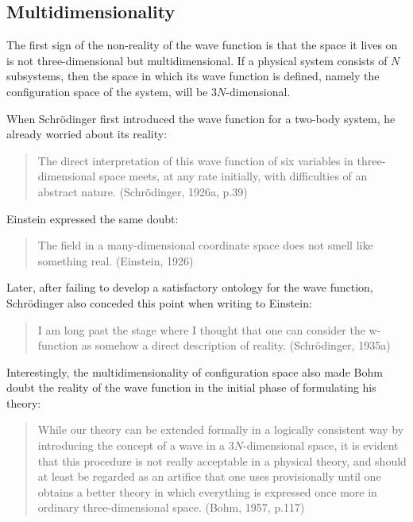 \subsection{Multidimensionality}

The first sign of the non-reality of the wave function is that the space it lives on is not three-dimensional but multidimensional. If a physical system consists of $N$ subsystems, then the space in which its wave function is defined, namely the configuration space of the system, will be $3N$-dimensional. 

When Schr\"{o}dinger first introduced the wave function for a two-body system, he already worried about its reality:

\begin{quote}
The direct interpretation of this wave function of six variables in three-dimensional space meets, at any rate initially, with difficulties of an abstract nature. (Schr\"{o}dinger, 1926a, p.39)
\end{quote}

\noindent Einstein expressed the same doubt:

\begin{quote}
The field in a many-dimensional coordinate space does not smell like something real. (Einstein, 1926)
\end{quote}
\noindent Later, after failing to develop a satisfactory ontology for the wave function, Schr\"{o}dinger also conceded this point when writing to Einstein:

\begin{quote}
I am long past the stage where I thought that one can consider the w-function as somehow a direct description of reality. (Schr\"{o}dinger, 1935a)
\end{quote}

\noindent Interestingly, the multidimensionality of configuration space also made Bohm doubt the reality of the wave function in the initial phase of formulating his theory:

\begin{quote}
While our theory can be extended formally in a logically consistent way by introducing the concept of a wave in a $3N$-dimensional space, it is evident that this procedure is not really acceptable in a physical theory, and should at least be regarded as an artifice that one uses provisionally until one obtains a better theory in which everything is expressed once more in ordinary three-dimensional space. (Bohm, 1957, p.117)
\end{quote}

